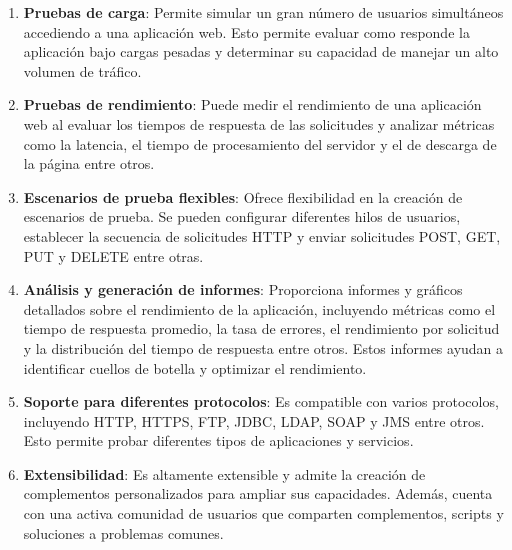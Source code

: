 \begin{enumerate}
    \item \textbf{Pruebas de carga}: Permite simular un gran número de usuarios simultáneos accediendo a una aplicación web. Esto permite evaluar como responde la aplicación bajo cargas pesadas y determinar su capacidad de manejar un alto volumen de tráfico.
    \item \textbf{Pruebas de rendimiento}: Puede medir el rendimiento de una aplicación web al evaluar los tiempos de respuesta de las solicitudes y analizar métricas como la latencia, el tiempo de procesamiento del servidor y el de descarga de la página entre otros.
    \item \textbf{Escenarios de prueba flexibles}: Ofrece flexibilidad en la creación de escenarios de prueba. Se pueden configurar diferentes hilos de usuarios, establecer la secuencia de solicitudes HTTP y enviar solicitudes POST, GET, PUT y DELETE entre otras.
    \item \textbf{Análisis y generación de informes}: Proporciona informes y gráficos detallados sobre el rendimiento de la aplicación, incluyendo métricas como el tiempo de respuesta promedio, la tasa de errores, el rendimiento por solicitud y la distribución del tiempo de respuesta entre otros. Estos informes ayudan a identificar cuellos de botella y optimizar el rendimiento.
    \item \textbf{Soporte para diferentes protocolos}: Es compatible con varios protocolos, incluyendo HTTP, HTTPS, FTP, JDBC, LDAP, SOAP y JMS entre otros. Esto permite probar diferentes tipos de aplicaciones y servicios.
    \item \textbf{Extensibilidad}: Es altamente extensible y admite la creación de complementos personalizados para ampliar sus capacidades. Además, cuenta con una activa comunidad de usuarios que comparten complementos, scripts y soluciones a problemas comunes.
\end{enumerate}
